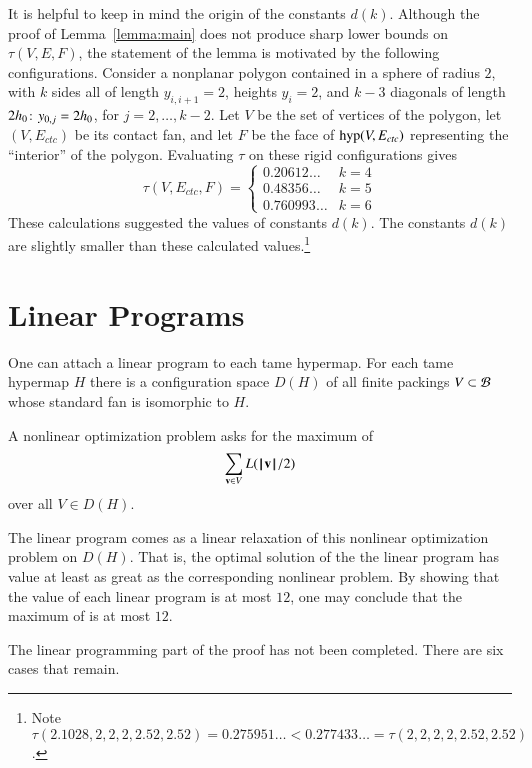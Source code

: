 \begin{remark}
It is helpful to keep in mind the origin of the constants $d(k)$.
Although the proof of Lemma~\ref{lemma:main} does not produce sharp lower bounds on $\tau(V,E,F)$, the
statement of the lemma is motivated by the following configurations.
Consider a nonplanar polygon contained in a sphere of radius $2$, with $k$ sides all of length $y_{i,i+1}=2$, heights
$y_i=2$, and $k-3$ diagonals of length $2{h_0}$: $y_{0,j}=2{h_0}$, for
$j=2,\ldots,k-2$.  Let $V$ be the set of vertices of the polygon, let $(V,E_{ctc})$ be its contact fan, and let $F$ be the face of ${\operatorname{hyp}}(V,E_{ctc})$ representing the ``interior'' of the polygon.  Evaluating $\tau$ on these rigid configurations gives
$$
\tau(V,E_{ctc},F) = \begin{cases}
0.20612\ldots & k=4\\
0.48356\ldots & k=5\\
0.760993\ldots &k=6
\end{cases}
$$
These calculations suggested the values of constants $d(k)$.  The constants $d(k)$ are slightly smaller than these calculated values.\footnote{Note $\tau(2.1028,2,2,2,2.52,2.52) = 0.275951\ldots < 0.277433\ldots = \tau(2,2,2,2,2.52,2.52)$.}
%
%
%
\end{remark}


\section{Linear Programs}

One can attach a linear program to each tame hypermap.
For each tame hypermap $H$ there is a configuration space $D(H)$ of all
finite packings $V\subset {\mathcal B}$ whose standard fan is
isomorphic to $H$.
%
%

A nonlinear optimization problem asks for the maximum of
\begin{equation}\label{eqn:L2}
\sum_{{\mathbf v}\in V} L({{\hskip0.1em|\hskip-0.15em|\hskip0.1em}{\mathbf v}{\hskip0.1em|\hskip-0.15em|\hskip0.1em}}/2)
\end{equation}
over all $V\in D(H)$.

The linear program comes as a linear relaxation of this nonlinear
optimization problem on $D(H)$. That is, the optimal solution of the
the linear program has value at least as great as the corresponding
nonlinear problem.  By showing that the value of each linear program
is at most $12$, one may conclude that the maximum of 
is at most $12$.


\begin{note}%
The linear programming part of the proof has not been completed. There are six cases that remain.
\end{note}


